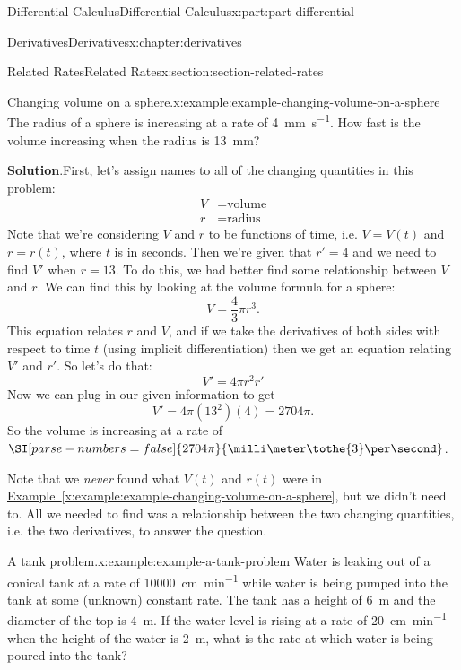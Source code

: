 \documentclass[twoside,10pt,]{book}
\newcommand{\blocktitlefont}{\relax}
\newcommand{\xreffont}{\relax}
\numberwithin{equation}{part}
\begin{document}
\begin{partptx}{Differential Calculus}{}{Differential Calculus}{}{}{x:part:part-differential}
\begin{chapterptx}{Derivatives}{}{Derivatives}{}{}{x:chapter:derivatives}
\typeout{************************************************}
%
\begin{sectionptx}{Related Rates}{}{Related Rates}{}{}{x:section:section-related-rates}
\begin{example}{Changing volume on a sphere.}{x:example:example-changing-volume-on-a-sphere}%
The radius of a sphere is increasing at a rate of \SI{4}{\milli\meter\per\second}. How fast is the volume increasing when the radius is \SI{13}{\milli\meter}?%
\par\smallskip%
\noindent\textbf{\blocktitlefont Solution}.\hypertarget{g:solution:idp105549212953248}{}\quad{}First, let's assign names to all of the changing quantities in this problem:%
\begin{align*}
V & = \text{volume} \\
r & = \text{radius} 
\end{align*}
Note that we're considering \(V\) and \(r\) to be functions of time, i.e. \(V = V(t)\) and \(r=r(t)\), where \(t\) is in seconds. Then we're given that \(r' = 4\) and we need to find \(V'\) when \(r=13\). To do this, we had better find some relationship between \(V\) and \(r\). We can find this by looking at the volume formula for a sphere:%
\begin{equation*}
V = \frac{4}{3}\pi r^{3}.
\end{equation*}
This equation relates \(r\) and \(V\), and if we take the derivatives of both sides with respect to time \(t\) (using implicit differentiation) then we get an equation relating \(V'\) and \(r'\). So let's do that:%
\begin{equation*}
V' = 4\pi r^{2}r'
\end{equation*}
Now we can plug in our given information to get%
\begin{equation*}
V' = 4\pi(13^{2})(4) = 2704\pi.
\end{equation*}
So the volume is increasing at a rate of $\SI[parse-numbers=false]{2704\pi}{\milli\meter\tothe{3}\per\second}$.%
\end{example}
Note that we \emph{never} found what \(V(t)\) and \(r(t)\) were in \hyperref[x:example:example-changing-volume-on-a-sphere]{Example~{\xreffont\ref{x:example:example-changing-volume-on-a-sphere}}}, but we didn't need to. All we needed to find was a relationship between the two changing quantities, i.e. the two derivatives, to answer the question.%
\begin{example}{A tank problem.}{x:example:example-a-tank-problem}%
Water is leaking out of a conical tank at a rate of \SI{10000}{\centi\meter\per\minute} while water is being pumped into the tank at some (unknown) constant rate. The tank has a height of \SI{6}{\meter} and the diameter of the top is \SI{4}{\meter}. If the water level is rising at a rate of \SI{20}{\centi\meter\per\minute} when the height of the water is \SI{2}{\meter}, what is the rate at which water is being poured into the tank?%

\end{example}
\end{sectionptx}
\end{chapterptx}
\end{partptx}
\end{document}
